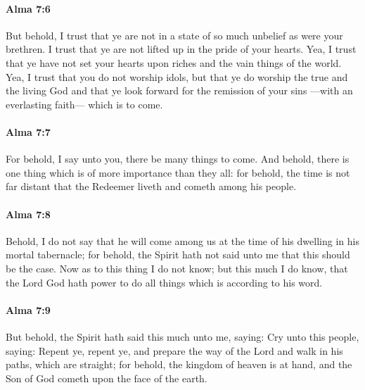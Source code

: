 		\paragraph{Alma 7:6} %
			\label{ALMA-7-6}

			But behold, I trust that ye are not in a state of so much unbelief
			as were your brethren.
			I trust that ye are not lifted up in the pride of your hearts.
			Yea, I trust that ye have not set your hearts
			upon riches and the vain things of the world.
			Yea, I trust that you do not worship idols,
			but that ye do worship the true and the living God
			and that ye look forward for the remission of your sins
			---with an everlasting faith---
			which is to come.

		\paragraph{Alma 7:7} %
			\label{ALMA-7-7}

			For behold, I say unto you, there be many things to come.
			And behold, there is one thing which is of more importance than they all:
			for behold, the time is not far distant
			that the Redeemer liveth and cometh among his people.

		\paragraph{Alma 7:8} %
			\label{ALMA-7-8}

			Behold, I do not say that he will come among us
			at the time of his dwelling in his mortal tabernacle;
			for behold, the Spirit hath not said unto me that this should be the case.
			Now as to this thing I do not know;
			but this much I do know,
			that the Lord God hath power to do all things
			which is according to his word.

		\paragraph{Alma 7:9} %
			\label{ALMA-7-9}

			But behold, the Spirit hath said this much unto me, saying:
			Cry unto this people, saying:
			Repent ye, repent ye,
			and prepare the way of the Lord
			and walk in his paths, which are straight;
			for behold, the kingdom of heaven is at hand,
			and the Son of God cometh upon the face of the earth.

